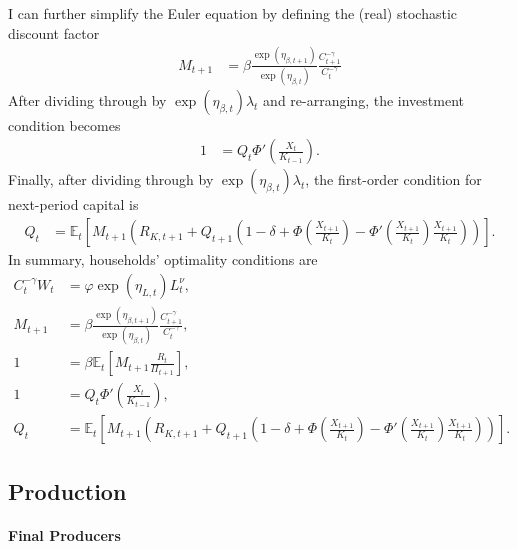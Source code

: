 \documentclass[12 pt, oneside]{article}
\theoremstyle{definition}
\theoremstyle{definition}
\theoremstyle{definition}
\newcommand{\E}{\mathbb{E}}
\begin{document}
I can further simplify the Euler equation by defining the (real) stochastic discount factor
\begin{align*}
  M_{t + 1} & = \beta\frac{\exp(\eta_{\beta, t + 1})}{\exp(\eta_{\beta, t})}\frac{C_{t + 1}^{-\gamma}}{C_t^{-\gamma}}
\end{align*}
After dividing through by $\exp(\eta_{\beta, t})\lambda_t$ and re-arranging, the investment condition becomes
\begin{align*}
  1 & = Q_t\Phi'\left(\frac{X_t}{K_{t - 1}}\right).
\end{align*}
Finally, after dividing through by $\exp(\eta_{\beta, t})\lambda_t$, the first-order condition for next-period capital is
\begin{align*}
  Q_t & = \E_t\left[M_{t + 1} \left(R_{K, t + 1} + Q_{t + 1}\left(1  - \delta + \Phi\left(\frac{X_{t + 1}}{K_t}\right) - \Phi'\left(\frac{X_{t + 1}}{K_t}\right)\frac{X_{t + 1}}{K_t}\right)\right)\right].
\end{align*}
In summary, households' optimality conditions are
\begin{align}
  \label{eq:consumption labor}
    C_t^{-\gamma} W_t & = \varphi\exp(\eta_{L, t}) L_t^\nu,\\
  \label{eq:stochastic discount factor}
  M_{t + 1} & = \beta\frac{\exp(\eta_{\beta, t + 1})}{\exp(\eta_{\beta, t})}\frac{C_{t + 1}^{-\gamma}}{C_t^{-\gamma}},\\
  \label{eq:euler eqn}
  1 & = \beta \E_t\left[M_{t + 1}\frac{R_t}{\Pi_{t + 1}}\right],\\
  \label{eq:tobins q}
  1 & = Q_t \Phi'\left(\frac{X_t}{K_{t - 1}}\right),\\
  \label{eq:capital asset pricing}
  Q_t & = \E_t\left[M_{t + 1} \left(R_{K, t + 1} + Q_{t + 1}\left(1  - \delta + \Phi\left(\frac{X_{t + 1}}{K_t}\right) - \Phi'\left(\frac{X_{t + 1}}{K_t}\right)\frac{X_{t + 1}}{K_t}\right)\right)\right].
\end{align}



\subsection{Production}

\paragraph{Final Producers}
\end{document}
